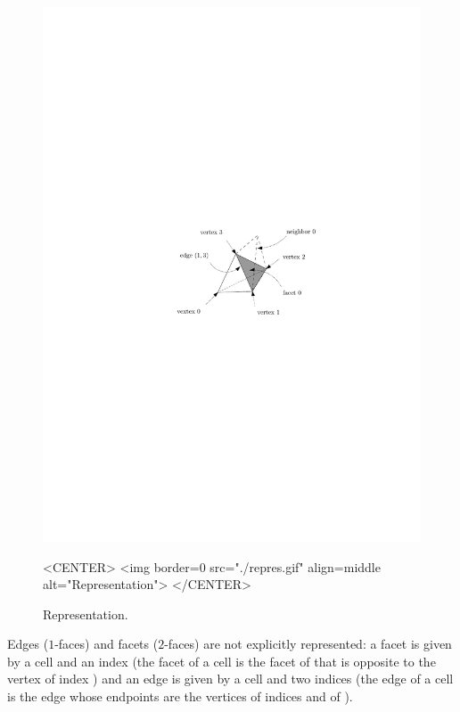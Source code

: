 \begin{figure}
\begin{ccTexOnly}
\begin{center} 
\includegraphics{TriangulationDS_3/repres}
\end{center}
\end{ccTexOnly}
\begin{ccHtmlOnly}
<CENTER>
<img border=0 src="./repres.gif" align=middle alt="Representation">
</CENTER>
\end{ccHtmlOnly}
\caption{Representation.
\label{TDS3-fig-repres}}
\end{figure} 

Edges ($1$-faces) and facets ($2$-faces) are not explicitly
represented: a facet is given by a cell and an index (the facet
 of a cell  is the facet of  that is opposite to
the vertex of index ) and an edge is given by a cell and two
indices (the edge  of a cell  is the edge
whose endpoints are the vertices of indices  and  of
). 

